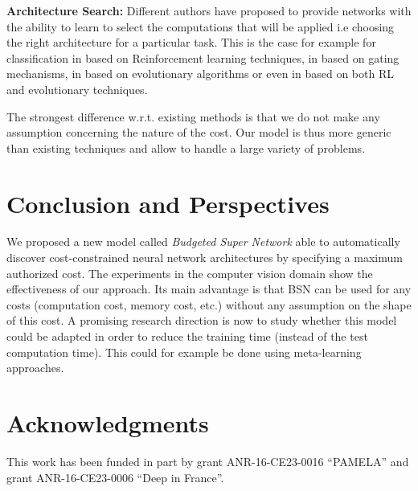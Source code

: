 \documentclass[10pt,twocolumn,letterpaper]{article}
\begin{document}
\textbf{Architecture Search: } Different authors have proposed to provide networks with the ability to learn to select the computations that will be applied i.e choosing the right architecture for a particular task. This is the case for example for classification in \cite{DBLP:journals/corr/DenoyerG14,DBLP:journals/corr/ZophL16} based on Reinforcement learning techniques, in \cite{DBLP:journals/corr/SrivastavaGS15} based on gating mechanisms,  in \cite{DBLP:journals/corr/RealMSSSLK17} based on  evolutionary algorithms or even in \cite{DBLP:journals/corr/FernandoBBZHRPW17} based on both RL and evolutionary techniques.

The strongest difference w.r.t. existing methods is that we do not make any assumption concerning the nature of the cost. Our model is thus more generic than existing techniques and allow to handle a large variety of problems.






\section{Conclusion and Perspectives}

We proposed a new model called \textit{Budgeted Super Network} able to automatically discover cost-constrained neural network architectures by specifying a maximum authorized cost. The experiments in the computer vision domain show the effectiveness of our approach. Its main advantage is that BSN can be used for any costs (computation cost, memory cost, etc.) without any assumption on the shape of this cost. A promising research direction is now to study whether this model could be adapted in order to reduce the training time (instead of the test computation time). This could for example be done using meta-learning approaches. 


\section*{Acknowledgments}
This work has been funded in part by grant ANR-16-CE23-0016 ``PAMELA'' and grant ANR-16-CE23-0006 ``Deep in France''.
\end{document}
